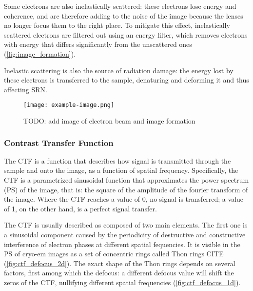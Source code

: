 Some electrons are also inelastically scattered: these electrons lose energy and coherence, and are therefore adding to the noise of the image because the lenses no longer focus them to the right place.
To mitigate this effect, inelastically scattered electrons are filtered out using an energy filter, which removes electrons with energy that differs significantly from the unscattered ones (\autoref{fig:image_formation}).

Inelastic scattering is also the source of radiation damage: the energy lost by these electrons is transferred to the sample, denaturing and deforming it and thus affecting SRN.

\begin{figure}[ht]
    \centering
    \texttt{[image: example-image.png]}
    \caption[Image formation in cryo-EM]{TODO: add image of electron beam and image formation}
    \label{fig:image_formation}
\end{figure}

\subsubsection{Contrast Transfer Function}

The CTF is a function that describes how signal is transmitted through the sample and onto the image, as a function of spatial frequency.
Specifically, the CTF is a parametrized sinusoidal function that approximates the power spectrum (PS) of the image, that is: the square of the amplitude of the fourier transform of the image.
Where the CTF reaches a value of \num{0}, no signal is transferred; a value of \num{1}, on the other hand, is a perfect signal transfer.

The CTF is usually described as composed of two main elements.
The first one is a sinusoidal component caused by the periodicity of destructive and constructive interference of electron phases at different spatial fequencies.
It is visible in the PS of cryo-em images as a set of concentric rings called Thon rings CITE (\autoref{fig:ctf_defocus_2d}).
The exact shape of the Thon rings depends on several factors, first among which the defocus: a different defocus value will shift the zeros of the CTF, nullifying different spatial frequencies (\autoref{fig:ctf_defocus_1d}).

